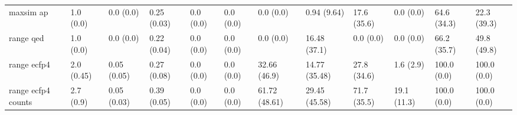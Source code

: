 \begin{tabular}{llllllllllll}
maxsim ap & {\cellcolor[HTML]{F4FBFC}} \color[HTML]{000000} 1.0 (0.0) & {\cellcolor[HTML]{F7FCFD}} \color[HTML]{000000} 0.0 (0.0) & {\cellcolor[HTML]{CCECE6}} \color[HTML]{000000} 0.25 (0.03) & {\cellcolor[HTML]{F7FCFD}} \color[HTML]{000000} 0.0 (0.0) & {\cellcolor[HTML]{F7FCFD}} \color[HTML]{000000} 0.0 (0.0) & {\cellcolor[HTML]{F7FCFD}} \color[HTML]{000000} 0.0 (0.0) & {\cellcolor[HTML]{F6FCFD}} \color[HTML]{000000} 0.94 (9.64) & {\cellcolor[HTML]{DBF1F1}} \color[HTML]{000000} 17.6 (35.6) & {\cellcolor[HTML]{F7FCFD}} \color[HTML]{000000} 0.0 (0.0) & {\cellcolor[HTML]{3CA86D}} \color[HTML]{F1F1F1} 64.6 (34.3) & {\cellcolor[HTML]{D1EEEA}} \color[HTML]{000000} 22.3 (39.3) \\
range qed & {\cellcolor[HTML]{F4FBFC}} \color[HTML]{000000} 1.0 (0.0) & {\cellcolor[HTML]{F7FCFD}} \color[HTML]{000000} 0.0 (0.0) & {\cellcolor[HTML]{D3EEEB}} \color[HTML]{000000} 0.22 (0.04) & {\cellcolor[HTML]{F7FCFD}} \color[HTML]{000000} 0.0 (0.0) & {\cellcolor[HTML]{F7FCFD}} \color[HTML]{000000} 0.0 (0.0) & {\cellcolor[HTML]{F7FCFD}} \color[HTML]{000000} 0.0 (0.0) & {\cellcolor[HTML]{DDF2F3}} \color[HTML]{000000} 16.48 (37.1) & {\cellcolor[HTML]{F7FCFD}} \color[HTML]{000000} 0.0 (0.0) & {\cellcolor[HTML]{F7FCFD}} \color[HTML]{000000} 0.0 (0.0) & {\cellcolor[HTML]{38A367}} \color[HTML]{F1F1F1} 66.2 (35.7) & {\cellcolor[HTML]{67C2A5}} \color[HTML]{000000} 49.8 (49.8) \\
range ecfp4 & {\cellcolor[HTML]{EEF8FB}} \color[HTML]{000000} 2.0 (0.45) & {\cellcolor[HTML]{F7FCFD}} \color[HTML]{000000} 0.05 (0.05) & {\cellcolor[HTML]{C5E9E2}} \color[HTML]{000000} 0.27 (0.08) & {\cellcolor[HTML]{F7FCFD}} \color[HTML]{000000} 0.0 (0.0) & {\cellcolor[HTML]{F7FCFD}} \color[HTML]{000000} 0.0 (0.0) & {\cellcolor[HTML]{ADE0D4}} \color[HTML]{000000} 32.66 (46.9) & {\cellcolor[HTML]{E1F4F6}} \color[HTML]{000000} 14.77 (35.48) & {\cellcolor[HTML]{C0E7DF}} \color[HTML]{000000} 27.8 (34.6) & {\cellcolor[HTML]{F5FBFC}} \color[HTML]{000000} 1.6 (2.9) & {\cellcolor[HTML]{00441B}} \color[HTML]{F1F1F1} 100.0 (0.0) & {\cellcolor[HTML]{00441B}} \color[HTML]{F1F1F1} 100.0 (0.0) \\
range ecfp4 counts & {\cellcolor[HTML]{F5FBFD}} \color[HTML]{000000} 2.7 (0.9) & {\cellcolor[HTML]{F7FCFD}} \color[HTML]{000000} 0.05 (0.03) & {\cellcolor[HTML]{90D4C3}} \color[HTML]{000000} 0.39 (0.05) & {\cellcolor[HTML]{F7FCFD}} \color[HTML]{000000} 0.0 (0.0) & {\cellcolor[HTML]{F7FCFD}} \color[HTML]{000000} 0.0 (0.0) & {\cellcolor[HTML]{43AF78}} \color[HTML]{F1F1F1} 61.72 (48.61) & {\cellcolor[HTML]{BAE5DC}} \color[HTML]{000000} 29.45 (45.58) & {\cellcolor[HTML]{2B9452}} \color[HTML]{F1F1F1} 71.7 (35.5) & {\cellcolor[HTML]{D8F0EF}} \color[HTML]{000000} 19.1 (11.3) & {\cellcolor[HTML]{00441B}} \color[HTML]{F1F1F1} 100.0 (0.0) & {\cellcolor[HTML]{00441B}} \color[HTML]{F1F1F1} 100.0 (0.0) \\

\end{tabular}
